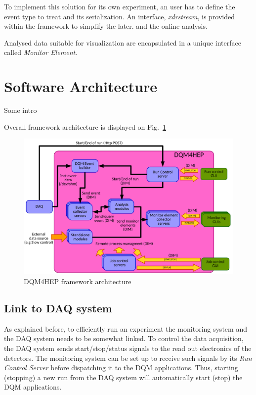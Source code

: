 \documentclass[conference]{IEEEtran}
\begin{document}
To implement this solution for its own experiment, an user has to define the event type to treat and its serialization. An interface, \textit{xdrstream}, is provided within the framework to simplify the later.   and the online analysis.

Analysed data suitable for visualization are encapsulated in a unique interface called \emph{Monitor Element}.



\section{Software Architecture}
{\color{red}Some intro}

Overall framework architecture is displayed on Fig.~\ref{fig:DQM4HEPArchitecture}
\begin{figure}[htbp]
  \begin{center}
    \includegraphics[width=0.95\linewidth]{figs/GlobalArchitectureDiagram.pdf}
    \caption{\label{fig:DQM4HEPArchitecture} DQM4HEP framework architecture}
  \end{center}
\end{figure}


\subsection{Link to DAQ system}
As explained before, to efficiently run an experiment the monitoring system and the DAQ system needs to be somewhat linked. To control the data acquisition, the DAQ system sends start/stop/status signals to the read out electronics of the detectors. The monitoring system can be set up to receive such signals by
its \textit{Run Control Server} before dispatching it to the DQM applications. Thus, starting (stopping) a new run from the DAQ system will automatically start (stop) the DQM applications.
\end{document}
